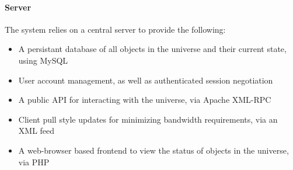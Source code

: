\paragraph{Server}
The system relies on a central server to provide the following:
\begin{itemize}
\item A persistant database of all objects in the universe and their current state, using MySQL
\item User account management, as well as authenticated session negotiation
\item A public API for interacting with the universe, via Apache XML-RPC \cite{XMLRPC}
\item Client pull style updates for minimizing bandwidth requirements, via an XML feed
\item A web-browser based frontend to view the status of objects in the universe, via PHP
\end{itemize}

